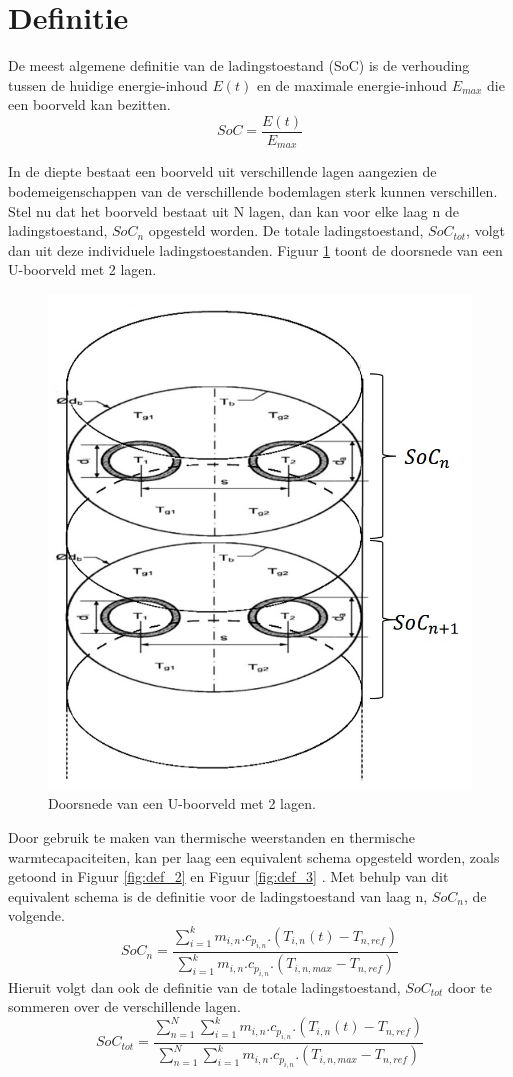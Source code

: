 \documentclass[a4paper,oneside,11pt]{report}
\numberwithin{figure}{section}
\numberwithin{table}{section}
\numberwithin{equation}{section}
\begin{document}
\newpage


\section{Definitie}

De meest algemene definitie van de ladingstoestand (SoC) is de verhouding tussen de huidige energie-inhoud $E(t)$ en de maximale energie-inhoud $E_{max}$ die een boorveld kan bezitten. \cite{R28}
\\ \begin{equation}\label{def_eq1}
SoC=\dfrac{E(t)}{E_{max}}
\end{equation}

In de diepte bestaat een boorveld uit verschillende lagen aangezien de bodemeigenschappen van de verschillende bodemlagen sterk kunnen verschillen. Stel nu dat het boorveld bestaat uit N lagen, dan kan voor elke laag n de ladingstoestand, $SoC_n$ opgesteld worden. De totale ladingstoestand, $SoC_{tot}$, volgt dan uit deze individuele ladingstoestanden. Figuur \ref{fig:def_1} toont de doorsnede van een U-boorveld met 2 lagen. 

\begin{figure}[hbtp] 
	\centering
	\includegraphics[width=0.4 \textwidth]{def_fig1.jpg}
	\caption{Doorsnede van een U-boorveld met 2 lagen.}
	\label{fig:def_1}
\end{figure}
 

Door gebruik te maken van thermische weerstanden en thermische warmtecapaciteiten, kan per laag een equivalent schema opgesteld worden, zoals getoond in Figuur \ref{fig:def_2} en Figuur \ref{fig:def_3} \cite{R23}. Met behulp van dit equivalent schema is de definitie voor de ladingstoestand van laag n, $SoC_n$,  de volgende.\cite{R28}\\
\begin{equation}\label{def_eq2}
SoC_n=\dfrac{\sum\limits_{i=1}^k m_{i,n}.c_{p_{i,n}}.(T_{i,n}(t)-T_{n,ref})}{\sum\limits_{i=1}^k m_{i,n}.c_{p_{i,n}}.(T_{i,n,max}-T_{n,ref})}
\end{equation}
Hieruit volgt dan ook de definitie van de totale ladingstoestand, $SoC_{tot}$ door te sommeren over de verschillende lagen.
\\
\begin{equation}\label{def_eq3}
SoC_{tot}=\dfrac{\sum\limits_{n=1}^N \sum\limits_{i=1}^k m_{i,n}.c_{p_{i,n}}.(T_{i,n}(t)-T_{n,ref}) }{\sum\limits_{n=1}^N \sum\limits_{i=1}^k m_{i,n}.c_{p_{i,n}}.(T_{i,n,max}-T_{n,ref})}
\end{equation}
\end{document}
